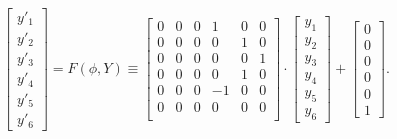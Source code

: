 $$\left[\begin{array}{c}
y'_1\\y'_2\\y'_3\\y'_4\\y'_5\\y'_6\end{array}\right]=
F(\phi,Y)\equiv\left[\begin{array}{cccccc}
0 & 0 & 0 & 1 & 0 & 0\\
0 & 0 & 0 & 0 & 1 & 0\\
0 & 0 & 0 & 0 & 0 & 1\\
0 & 0 & 0 & 0 & 1 & 0\\
0 & 0 & 0 & -1 & 0 & 0\\
0 & 0 & 0 & 0 & 0 & 0\\
\end{array}\right]\cdot \left[\begin{array}{c}
y_1\\y_2\\y_3\\y_4\\y_5\\y_6\end{array}\right]+\left[\begin{array}{c}
0\\0\\0\\0\\0\\1\end{array}\right] .$$

